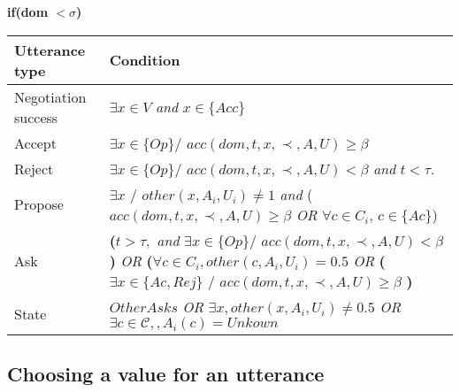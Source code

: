 \documentclass{article}
\begin{document}
	\textbf{if(\textbf{dom  $<\sigma$})} \\
	\begin{tabular}{|p{3cm}|p{9cm}|}
		\hline
		\textbf{Utterance type} & Condition \\
		\hline
		Negotiation success &  $\exists x \in V$ \emph{and} $x \in \{Acc\}$ \\
		\hline
		Accept & $\exists x \in \{Op\} /$ \newline $acc(dom,t,x,\prec,A,U) \geq \beta$ \\
		\hline
		Reject & $\exists x \in \{Op\} /$ \newline $ acc(dom,t,x,\prec,A,U) < \beta$  \emph{and} $t<\tau$.\\
		\hline
		Propose & $\exists x$ / $other(x, A_i, U_i) \not = 1 $  \emph{and}
		\newline ($acc(dom,t,x,\prec,A,U) \geq \beta$
		\newline \emph{OR}  
		\newline $\forall c \in C_i$,  $c \in \{Ac\}$)\\
		\hline
		Ask &  \textbf{(}$t> \tau,$ \emph{and} 
		\newline $\exists x \in \{Op\} /$
		\newline $ acc(dom,t,x,\prec,A,U) < \beta $\textbf{) }
		\newline \emph{OR}
		\newline \textbf{(}$ \forall c \in C_i,other(c, A_i, U_i)=0.5$
		\newline \emph{OR} 
		\newline \textbf{(}$\exists x \in \{Ac, Rej\}$ / 
		\newline $acc(dom,t,x,\prec,A,U) \geq \beta$ \textbf{)} \\
		\hline
		
		State & $OtherAsks$
		\newline \emph{OR}
		\newline $\exists x,other(x, A_i, U_i) \not = 0.5 $ 
		\newline \emph{OR}
		\newline $ \exists c \in \mathcal{C}, , A_i(c) = Unkown$
		\\
		\hline
	\end{tabular}
	

	\subsection{Choosing a value for an utterance}
	
	
\end{document}
